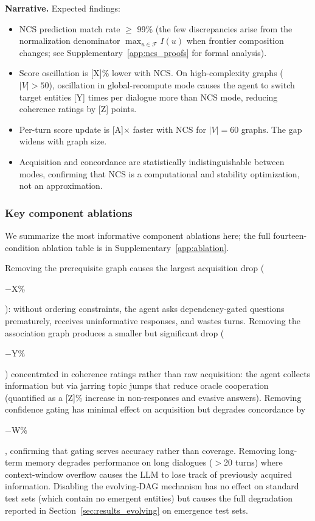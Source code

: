 \documentclass[11pt,a4paper]{article}
\newcommand{\placeholder}[1]{%
  \begin{tcolorbox}[colback=yellow!10,colframe=orange!60!black,
    fonttitle=\bfseries,title=Placeholder]
    #1
  \end{tcolorbox}%
}
\begin{document}
\placeholder{%
  \textbf{Narrative.} Expected findings:
  \begin{itemize}[noitemsep]
    \item NCS prediction match rate $\geq$ 99\% (the few discrepancies
          arise from the normalization denominator
          $\max_{u \in \mathcal{F}} I(u)$ when frontier composition changes;
          see Supplementary~\ref{app:ncs_proofs} for formal analysis).
    \item Score oscillation is [X]\% lower with NCS. On high-complexity
          graphs ($|V| > 50$), oscillation in global-recompute mode causes
          the agent to switch target entities [Y] times per dialogue more
          than NCS mode, reducing coherence ratings by [Z] points.
    \item Per-turn score update is [A]$\times$ faster with NCS for
          $|V| = 60$ graphs. The gap widens with graph size.
    \item Acquisition and concordance are statistically indistinguishable
          between modes, confirming that NCS is a computational and stability
          optimization, not an approximation.
  \end{itemize}
}

\subsubsection{Key component ablations}
\label{sec:results_ablation_summary}

We summarize the most informative component ablations here; the full
fourteen-condition ablation table is in Supplementary~\ref{app:ablation}.

\begin{table}[!htbp]
\centering
\caption{Key ablations on hypertension domain ([N] cases). Full DualGraph
in the first row; each subsequent row removes one component. $\Delta$Acq.\
is the change in acquisition relative to full DualGraph.}
\label{tab:ablation_summary}
\small

\end{table}

Removing the prerequisite graph causes the largest acquisition drop
(\placeholder{$-$X\%}): without ordering constraints, the agent asks
dependency-gated questions prematurely, receives uninformative responses,
and wastes turns. Removing the association graph produces a smaller but
significant drop (\placeholder{$-$Y\%}) concentrated in coherence ratings
rather than raw acquisition: the agent collects information but via jarring
topic jumps that reduce oracle cooperation (quantified as a [Z]\% increase
in non-responses and evasive answers). Removing confidence gating has minimal
effect on acquisition but degrades concordance by \placeholder{$-$W\%},
confirming that gating serves accuracy rather than coverage. Removing
long-term memory degrades performance on long dialogues ($>$20 turns) where
context-window overflow causes the LLM to lose track of previously acquired
information. Disabling the evolving-DAG mechanism has no effect on standard
test sets (which contain no emergent entities) but causes the full
degradation reported in Section~\ref{sec:results_evolving} on emergence test
sets.
\end{document}
